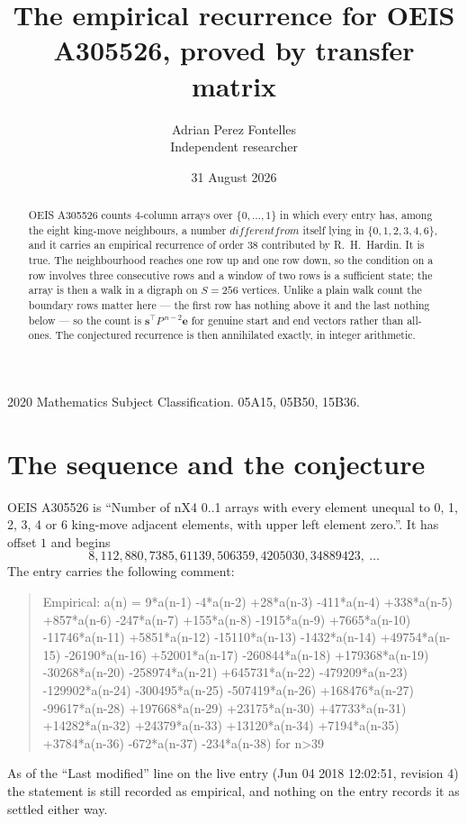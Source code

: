 \documentclass[11pt,a4paper]{article}
\title{The empirical recurrence for OEIS A305526, proved by transfer matrix}
\author{Adrian Perez Fontelles\\ \small Independent researcher}
\date{31 August 2026}
\theoremstyle{plain}
\theoremstyle{definition}
\begin{document}
\maketitle

\begin{abstract}
OEIS A305526 counts $4$-column arrays over $\{0,\dots,1\}$ in which every entry has,
among the eight king-move neighbours, a number $different from$ itself lying in $\{0,1,2,3,4,6\}$, and it carries an empirical
recurrence of order $38$ contributed by R.~H.~Hardin. It is true. The neighbourhood
reaches one row up and one row down, so the condition on a row involves three consecutive
rows and a window of two rows is a sufficient state; the array is then a walk in a digraph
on $S=256$ vertices. Unlike a plain walk count the boundary rows matter here --- the first
row has nothing above it and the last nothing below --- so the count is
$\mathbf{s}^{\!\top}P^{\,n-2}\mathbf{e}$ for genuine start and end vectors rather than
all-ones. The conjectured recurrence is then annihilated exactly, in integer arithmetic.
\end{abstract}

\noindent\small 2020 Mathematics Subject Classification. 05A15, 05B50, 15B36.\normalsize

\section{The sequence and the conjecture}

OEIS A305526 is ``Number of nX4 0..1 arrays with every element unequal to 0, 1, 2, 3, 4 or 6 king-move adjacent elements, with upper left element zero.''. It has offset
$1$ and begins
\[
8, 112, 880, 7385, 61139, 506359, 4205030, 34889423,\ \dots
\]
The entry carries the following comment:
\begin{quote}\small
Empirical: a(n) = 9*a(n-1) -4*a(n-2) +28*a(n-3) -411*a(n-4) +338*a(n-5) +857*a(n-6) -247*a(n-7) +155*a(n-8) -1915*a(n-9) +7665*a(n-10) -11746*a(n-11) +5851*a(n-12) -15110*a(n-13) -1432*a(n-14) +49754*a(n-15) -26190*a(n-16) +52001*a(n-17) -260844*a(n-18) +179368*a(n-19) -30268*a(n-20) -258974*a(n-21) +645731*a(n-22) -479209*a(n-23) -129902*a(n-24) -300495*a(n-25) -507419*a(n-26) +168476*a(n-27) -99617*a(n-28) +197668*a(n-29) +23175*a(n-30) +47733*a(n-31) +14282*a(n-32) +24379*a(n-33) +13120*a(n-34) +7194*a(n-35) +3784*a(n-36) -672*a(n-37) -234*a(n-38) for n>39
\end{quote}
As of the ``Last modified'' line on the live entry (Jun 04 2018 12:02:51, revision
4) the statement is still recorded as empirical, and nothing on the entry
records it as settled either way.
\end{document}
